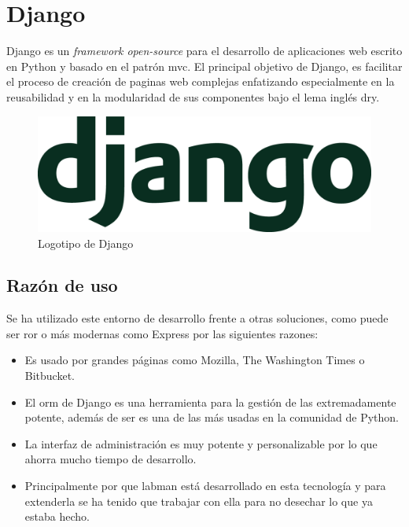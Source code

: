\section{Django}

Django es un \textit{framework open-source} para el desarrollo de aplicaciones web escrito en Python y basado en el patrón \acrfull{mvc}. El principal objetivo de Django, es facilitar el proceso de creación de paginas web complejas enfatizando especialmente en la reusabilidad y en la modularidad de sus componentes bajo el lema inglés \acrfull{dry}.

\begin{figure}[!htbp]
	\centering
	\includegraphics[scale=0.18]{fig/django_logo}
	\caption{Logotipo de Django}
\end{figure}

\subsection{Razón de uso}

Se ha utilizado este entorno de desarrollo frente a otras soluciones, como puede ser \acrfull{ror}\cite{RoR} o más modernas como Express\cite{Express} por las siguientes razones:

\begin{itemize}
	\item Es usado por grandes páginas como Mozilla, The Washington Times\cite{TWT} o Bitbucket\cite{Bitbucket}.
	\item El \acrshort{orm} de Django es una herramienta para la gestión de las  extremadamente potente, además de ser es una de las más usadas en la comunidad de Python.
	\item La interfaz de administración es muy potente y personalizable por lo que ahorra mucho tiempo de desarrollo.
	\item Principalmente por que \acrshort{labman} está desarrollado en esta tecnología y para extenderla se ha tenido que trabajar con ella para no desechar lo que ya estaba hecho.
\end{itemize}

